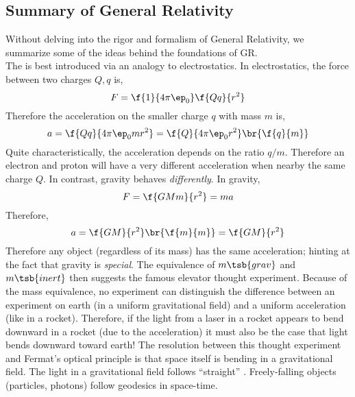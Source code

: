 \documentclass{article}
\begin{document}
\subsection{Summary of General Relativity}
Without delving into the rigor and formalism of General Relativity, we summarize some of the ideas behind the foundations of GR.\\

The  is best introduced via an analogy to electrostatics. In electrostatics, the force between two charges $Q, q$ is,
\[ F = \f{1}{4\pi\ep_0}\f{Qq}{r^2} \]
Therefore the acceleration on the smaller charge $q$ with mass $m$ is,
\[ a = \f{Qq}{4\pi\ep_0mr^2} = \f{Q}{4\pi\ep_0r^2}\br{\f{q}{m}} \]
Quite characteristically, the acceleration depends on the ratio $q/m$. Therefore an electron and proton will have a very different acceleration when nearby the same charge $Q$. In contrast, gravity behaves \textit{differently}. In gravity,
\[ F = \f{GMm}{r^2} = ma \]
Therefore,
\[ a = \f{GM}{r^2} \br{\f{m}{m}} = \f{GM}{r^2} \]
Therefore any object (regardless of its mass) has the same acceleration; hinting at the fact that gravity is \textit{special}. The equivalence of $m\tsb{grav}$ and $m\tsb{inert}$ then suggests the famous elevator thought experiment. Because of the mass equivalence, no experiment can distinguish the difference between an experiment on earth (in a uniform gravitational field) and a uniform acceleration (like in a rocket). Therefore, if the light from a laser in a rocket appears to bend downward in a rocket (due to the acceleration) it must also be the case that light bends downward toward earth! The resolution between this thought experiment and Fermat's optical principle is that space itself is bending in a gravitational field. The light in a gravitational field follows ``straight'' . Freely-falling objects (particles, photons) follow geodesics in space-time. \\
\end{document}
